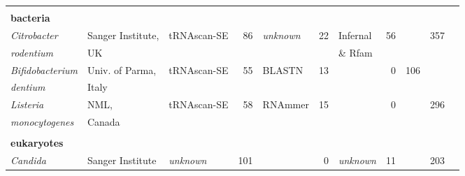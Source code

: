 \begin{footnotesize}
\begin{table}
\begin{center}
\begin{tabular}{|ll|lr|lr|lr|c|rr|}
\multicolumn{11}{l}{} \\
\multicolumn{11}{l}{\textbf{bacteria}} \\ \cline{1-8} \cline{9-11}
\emph{Citrobacter}                       & Sanger Institute, & tRNAscan-SE   & 86       & \emph{unknown} & 22 & Infernal       & 56       & & 357 & \\
\emph{rodentium}                         & UK                &               &          &                &    & \& Rfam        &          & & & \\ \cline{1-8} \cline{9-11}
\emph{Bifidobacterium}                   & Univ. of Parma,   & tRNAscan-SE   & 55       & BLASTN         & 13 &                &  0       & 106 & \\
\emph{dentium}                           & Italy             &               &          &                &    &                &          & & \\ \cline{1-8} \cline{9-11}
\emph{Listeria}                          & NML,              & tRNAscan-SE   & 58       & RNAmmer        & 15 &                & 0        & & 296 & \\
\emph{monocytogenes}                     & Canada            &               &          &                &    &                &          & & & \\ \cline{1-8} \cline{9-11}
\multicolumn{11}{l}{} \\
\multicolumn{11}{l}{\textbf{eukaryotes}} \\ \cline{1-8} \cline{9-11}
\emph{Candida}                           & Sanger Institute  &\emph{unknown} &     101  &                & 0  & \emph{unknown} & 11       & & 203 & \\

\end{tabular}
\end{center}
\end{table}
\end{footnotesize}
